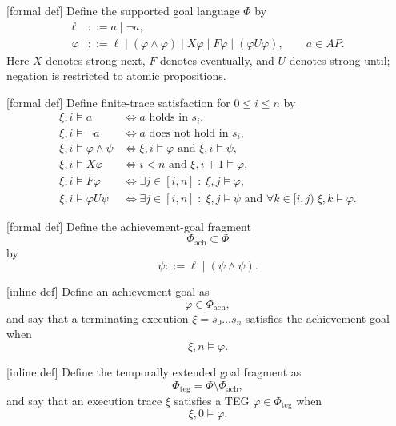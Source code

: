 [formal def] Define the supported goal language \(\Phi\) by
\[
\begin{aligned}
\ell &::= a \mid \neg a,\\
\varphi &::= \ell
          \mid (\varphi\land\varphi)
          \mid X\varphi
          \mid F\varphi
          \mid (\varphi U\varphi),
          \qquad a\in AP.
\end{aligned}
\]
Here \(X\) denotes strong next, \(F\) denotes eventually, and \(U\) denotes
strong until; negation is restricted to atomic propositions.

[formal def] Define finite-trace satisfaction for
\(0\leq i\leq n\) by
\[
\begin{aligned}
\xi,i\models a
&\iff a\text{ holds in }s_i,\\
\xi,i\models\neg a
&\iff a\text{ does not hold in }s_i,\\
\xi,i\models\varphi\land\psi
&\iff \xi,i\models\varphi
    \text{ and }\xi,i\models\psi,\\
\xi,i\models X\varphi
&\iff i<n
    \text{ and }\xi,i+1\models\varphi,\\
\xi,i\models F\varphi
&\iff \exists j\in[i,n]\;:\;\xi,j\models\varphi,\\
\xi,i\models\varphi U\psi
&\iff
\exists j\in[i,n]\;:\;
\xi,j\models\psi
\text{ and }
\forall k\in[i,j)\; \xi,k\models\varphi.
\end{aligned}
\]

[formal def] Define the achievement-goal fragment
\[
\Phi_{\mathrm{ach}}\subset\Phi
\]
by
\[
\psi ::= \ell \mid (\psi\land\psi).
\]

[inline def] Define an achievement goal as
\[
\varphi\in\Phi_{\mathrm{ach}},
\]
and say that a terminating execution
\(\xi=s_0\ldots s_n\) satisfies the achievement goal when
\[
\xi,n\models\varphi.
\]

[inline def] Define the temporally extended goal fragment as
\[
\Phi_{\mathrm{teg}}
=
\Phi\setminus\Phi_{\mathrm{ach}},
\]
and say that an execution trace \(\xi\) satisfies a TEG
\(\varphi\in\Phi_{\mathrm{teg}}\) when
\[
\xi,0\models\varphi.
\]
